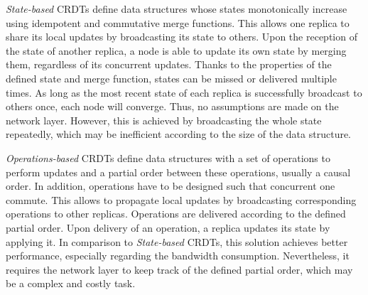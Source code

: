 \documentclass{article}
\begin{document}

\emph{State-based} \acp{CRDT} define data structures whose states monotonically increase using idempotent and commutative merge functions.
This allows one replica to share its local updates by broadcasting its state to others.
Upon the reception of the state of another replica, a node is able to update its own state by merging them,
regardless of its concurrent updates.
Thanks to the properties of the defined state and merge function, states can be missed or delivered multiple times.
As long as the most recent state of each replica is successfully broadcast to others once, each node will converge.
Thus, no assumptions are made on the network layer.
However, this is achieved by broadcasting the whole state repeatedly, which may be inefficient according to the size of the data structure.


\emph{Operations-based} \acp{CRDT} define data structures with a set of operations to perform updates
and a partial order between these operations, usually a causal order\cite{Prakash:1997:ACO:255495.255508}.
In addition, operations have to be designed such that concurrent one commute.
This allows to propagate local updates by broadcasting corresponding operations to other replicas.
Operations are delivered according to the defined partial order.
Upon delivery of an operation, a replica updates its state by applying it.
In comparison to \emph{State-based} \acp{CRDT}, this solution achieves better performance, especially regarding the bandwidth consumption.
Nevertheless, it requires the network layer to keep track of the defined partial order, which may be a complex and costly task.

\end{document}
